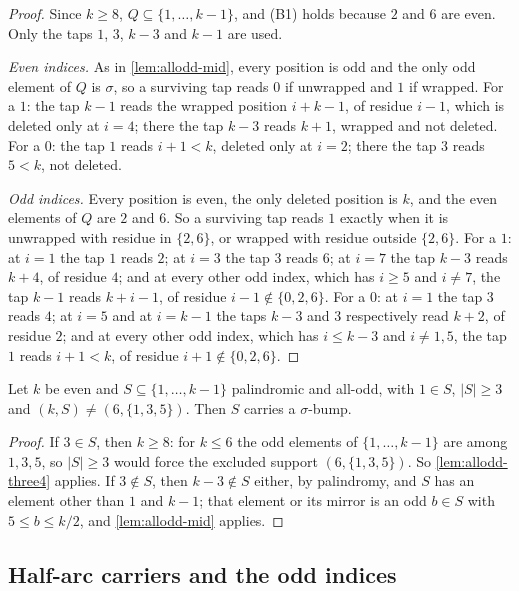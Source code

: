 \begin{proof}
Since $k\ge8$, $Q\subseteq\{1,\dots,k-1\}$, and (B1) holds because $2$ and $6$
are even. Only the taps $1$, $3$, $k-3$ and $k-1$ are used.

\emph{Even indices.} As in \autoref{lem:allodd-mid}, every position is odd and
the only odd element of $Q$ is $\sigma$, so a surviving tap reads $0$ if
unwrapped and $1$ if wrapped. For a $1$: the tap $k-1$ reads the wrapped
position $i+k-1$, of residue $i-1$, which is deleted only at $i=4$; there the
tap $k-3$ reads $k+1$, wrapped and not deleted. For a $0$: the tap $1$ reads
$i+1<k$, deleted only at $i=2$; there the tap $3$ reads $5<k$, not deleted.

\emph{Odd indices.} Every position is even, the only deleted position is
$k$, and the even elements of $Q$ are $2$ and $6$. So a surviving tap reads
$1$ exactly when it is unwrapped with residue in $\{2,6\}$, or wrapped with
residue outside $\{2,6\}$. For a $1$: at $i=1$ the tap $1$ reads $2$; at
$i=3$ the tap $3$ reads $6$; at $i=7$ the tap $k-3$ reads $k+4$, of residue
$4$; and at every other odd index, which has $i\ge5$ and $i\ne7$, the tap
$k-1$ reads $k+i-1$, of residue $i-1\notin\{0,2,6\}$. For a $0$: at $i=1$ the
tap $3$ reads $4$; at $i=5$ and at $i=k-1$ the taps $k-3$ and $3$
respectively read $k+2$, of residue $2$; and at every other odd index, which
has $i\le k-3$ and $i\ne1,5$, the tap $1$ reads $i+1<k$, of residue
$i+1\notin\{0,2,6\}$.
\end{proof}

\begin{proposition}
\label{prop:allodd-one}
Let $k$ be even and $S\subseteq\{1,\dots,k-1\}$ palindromic and all-odd, with
$1\in S$, $|S|\ge3$ and $(k,S)\ne(6,\{1,3,5\})$. Then $S$ carries a
$\sigma$-bump.
\end{proposition}

\begin{proof}
If $3\in S$, then $k\ge8$: for $k\le6$ the odd elements of $\{1,\dots,k-1\}$
are among $1,3,5$, so $|S|\ge3$ would force the excluded support
$(6,\{1,3,5\})$. So \autoref{lem:allodd-three4} applies. If $3\notin S$, then
$k-3\notin S$ either, by palindromy, and $S$ has an element other than $1$ and
$k-1$; that element or its mirror is an odd $b\in S$ with $5\le b\le k/2$, and
\autoref{lem:allodd-mid} applies.
\end{proof}

\subsection{Half-arc carriers and the odd indices}
\label{sec:allodd-halfarc}

